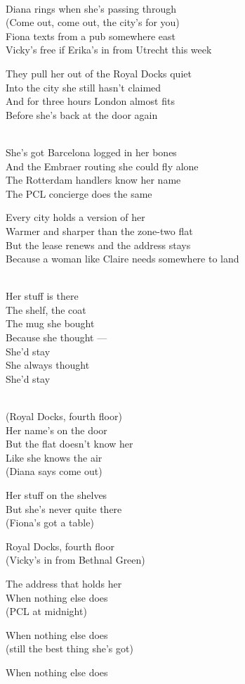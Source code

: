\begin{lyrics}
\\
Diana rings when she's passing through\\
(Come out, come out, the city's for you)\\
Fiona texts from a pub somewhere east\\
Vicky's free if Erika's in from Utrecht this week

They pull her out of the Royal Docks quiet\\
Into the city she still hasn't claimed\\
And for three hours London almost fits\\
Before she's back at the door again

\\
She's got Barcelona logged in her bones\\
And the Embraer routing she could fly alone\\
The Rotterdam handlers know her name\\
The PCL concierge does the same

Every city holds a version of her\\
Warmer and sharper than the zone-two flat\\
But the lease renews and the address stays\\
Because a woman like Claire needs somewhere to land

\\
Her stuff is there\\
The shelf, the coat\\
The mug she bought\\
Because she thought —\\
She'd stay\\
She always thought\\
She'd stay

\\
(Royal Docks, fourth floor)\\
Her name's on the door\\
But the flat doesn't know her\\
Like she knows the air\\
(Diana says come out)

Her stuff on the shelves\\
But she's never quite there\\
(Fiona's got a table)

Royal Docks, fourth floor\\
(Vicky's in from Bethnal Green)

The address that holds her\\
When nothing else does\\
(PCL at midnight)

When nothing else does\\
(still the best thing she's got)

When nothing else does
\end{lyrics}


